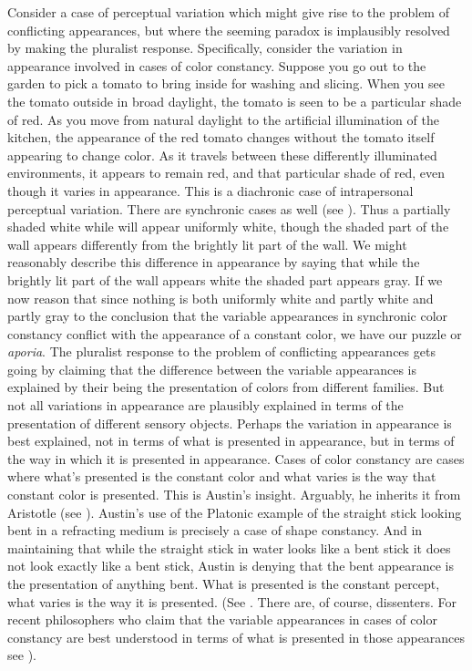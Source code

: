 \documentclass[12pt]{article}
\begin{document}
Consider a case of perceptual variation which might give rise to the problem of conflicting appearances, but where the seeming paradox is implausibly resolved by making the pluralist response. Specifically, consider the variation in appearance involved in cases of color constancy. Suppose you go out to the garden to pick a tomato to bring inside for washing and slicing. When you see the tomato outside in broad daylight, the tomato is seen to be a particular shade of red. As you move from natural daylight to the artificial illumination of the kitchen, the appearance of the red tomato changes without the tomato itself appearing to change color. As it travels between these differently illuminated environments, it appears to remain red, and that particular shade of red, even though it varies in appearance. This is a diachronic case of intrapersonal perceptual variation. There are synchronic cases as well (see \citealt{Cohen:2008hc}). Thus a partially shaded white while will appear uniformly white, though the shaded part of the wall appears differently from the brightly lit part of the wall. We might reasonably describe this difference in appearance by saying that while the brightly lit part of the wall appears white the shaded part appears gray. If we now reason that since nothing is both uniformly white and partly white and partly gray to the conclusion that the variable appearances in synchronic color constancy conflict with the appearance of a constant color, we have our puzzle or \emph{aporia}. The pluralist response to the problem of conflicting appearances gets going by claiming that the difference between the variable appearances is explained by their being the presentation of colors from different families. But not all variations in appearance are plausibly explained in terms of the presentation of different sensory objects. Perhaps the variation in appearance is best explained, not in terms of what is presented in appearance, but in terms of the way in which it is presented in appearance. Cases of color constancy are cases where what's presented is the constant color and what varies is the way that constant color is presented. This is Austin's \citeyearpar{Austin:1962lr} insight. Arguably, he inherits it from Aristotle (see \citealt{Kalderon:2015fr}). Austin's use of the Platonic example of the straight stick looking bent in a refracting medium is precisely a case of shape constancy. And in maintaining that while the straight stick in water looks like a bent stick it does not look exactly like a bent stick, Austin is denying that the bent appearance is the presentation of anything bent. What is presented is the constant percept, what varies is the way it is presented. (See \citealt{Chisholm:1957dq,Kalderon:2010fj}. There are, of course, dissenters. For recent philosophers who claim that the variable appearances in cases of color constancy are best understood in terms of what is presented in those appearances see \citealt{Noe:2004fk,Chalmers:2006kx}).
\end{document}
